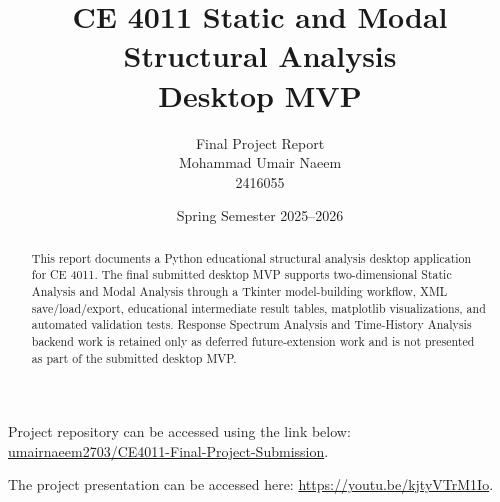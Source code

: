 \documentclass[10pt,a4paper]{article}
\title{\textbf{CE 4011 Static and Modal Structural Analysis\\Desktop MVP}}
\author{Final Project Report\\[0.5em]Mohammad Umair Naeem\\2416055}
\date{Spring Semester 2025--2026}
\begin{document}
\maketitle

\begin{abstract}
This report documents a Python educational structural analysis desktop application for CE 4011. The final submitted desktop MVP supports two-dimensional Static Analysis and Modal Analysis through a Tkinter model-building workflow, XML save/load/export, educational intermediate result tables, matplotlib visualizations, and automated validation tests. Response Spectrum Analysis and Time-History Analysis backend work is retained only as deferred future-extension work and is not presented as part of the submitted desktop MVP.
\end{abstract}

Project repository can be accessed using the link below: \href{https://github.com/umairnaeem2703/CE4011-Final-Project-Submission}{umairnaeem2703/CE4011-Final-Project-Submission}.

The project presentation can be accessed here: \href{https://youtu.be/kjtyVTrM1Io}{https://youtu.be/kjtyVTrM1Io}.

\tableofcontents
\newpage












\newpage
\nocite{ce4011project,projectreadme,projectarchitecture,projectmathspec}


\end{document}
